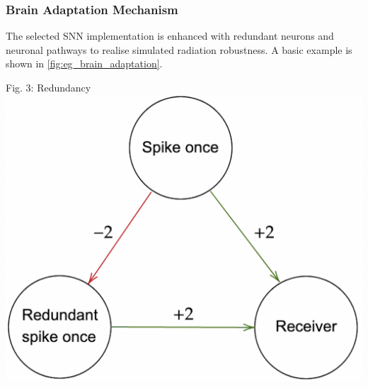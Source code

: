 \subsubsection*{Brain Adaptation Mechanism}\label{subsubsec:brain_adaptation_mechanisms}
The selected SNN implementation is enhanced with redundant neurons and neuronal pathways to realise simulated radiation robustness. A basic example is shown in \cref{fig:eg_brain_adaptation}.
\begin{rudifig}{\hsize}{Fig. 3: Redundancy}
    \hspace{-1em}
    \includegraphics[width=700pt]{latex/Images/brain_adaptation_alternative.png}
    \label{fig:eg_brain_adaptation}
\end{rudifig}


